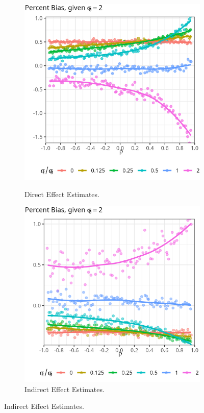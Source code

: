 \documentclass[a4paper, 12pt]{article}                                     %
\begin{document}
\begin{figure}[H]
    \centering
    \singlespacing
    \caption{Bias of Point Estimates in Simulated Data, across different $\rho, \sigma_0, \sigma_1$ values.}
    \begin{subfigure}[b]{0.495\textwidth}
        \centering
        \caption{Direct Effect Estimates.}
        \includegraphics[width=\textwidth]{sim-output/directeffect-bias.png}
        \label{fig:directeffect-bias}
    \end{subfigure}
    \begin{subfigure}[b]{0.495\textwidth}
        \centering
        \caption{Indirect Effect Estimates.}
        \includegraphics[width=\textwidth]{sim-output/indirecteffect-bias.png}

\end{subfigure}
\end{figure}
\end{document}
